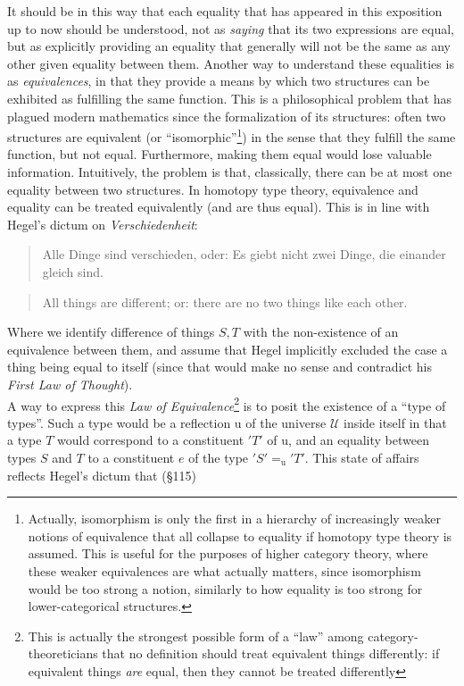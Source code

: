 \documentclass{article}
\begin{document}
It should be in this way that each equality that has appeared in this exposition up to now should be understood, not as \emph{saying} that its two expressions are equal, but as explicitly providing an equality that generally will not be the same as any other given equality between them. Another way to understand these equalities is as \emph{equivalences}, in that they provide a means by which two structures can be exhibited as fulfilling the same function. This is a philosophical problem that has plagued modern mathematics since the formalization of its structures: often two structures are equivalent (or ``isomorphic''\footnote{Actually, isomorphism is only the first in a hierarchy of increasingly weaker notions of equivalence that all collapse to equality if homotopy type theory is assumed. This is useful for the purposes of higher category theory, where these weaker equivalences are what actually matters, since isomorphism would be too strong a notion, similarly to how equality is too strong for lower-categorical structures.}) in the sense that they fulfill the same function, but not equal. Furthermore, making them equal would lose valuable information. Intuitively, the problem is that, classically, there can be at most one equality between two structures. In homotopy type theory, equivalence and equality can be treated equivalently (and are thus equal). This is in line with Hegel's dictum on \emph{Verschiedenheit}:

\begin{quote}
   Alle Dinge sind verschieden, oder: Es giebt nicht zwei Dinge, die einander gleich sind.
\end{quote}

\begin{quote}
    All things are different; or: there are no two things like each other.
\end{quote}

Where we identify difference of things $S,T$ with the non-existence of an equivalence between them, and assume that Hegel implicitly excluded the case a thing being equal to itself (since that would make no sense and contradict his \emph{First Law of Thought}). \\

A way to express this \emph{Law of Equivalence}\footnote{This is actually the strongest possible form of a ``law'' among category-theoreticians that no definition should treat equivalent things differently: if equivalent things \emph{are} equal, then they cannot be treated differently} is to posit the existence of a ``type of types''. Such a type would be a reflection $\mathrm{u}$ of the universe $\mathcal{U}$ inside itself in that a type $T$ would correspond to a constituent $'T'$ of $\mathrm{u}$, and an equality between types $S$ and $T$ to a constituent $e$ of the type $'S'=_{\mathrm{u}} 'T'$. This state of affairs reflects Hegel's dictum that (§115)
\end{document}
